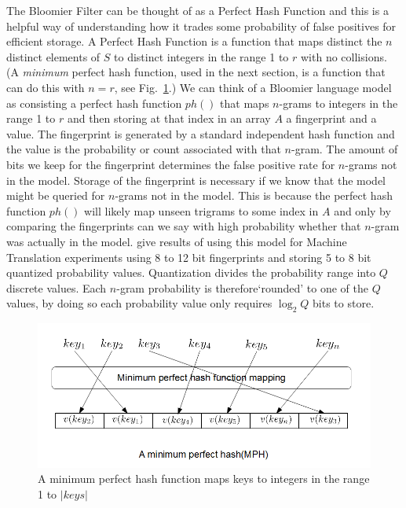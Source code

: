 \documentclass[10pt, a4paper]{article}
\begin{document}
The Bloomier Filter can be thought of as a Perfect Hash Function \cite{Botelho1997} and this is a helpful way of understanding how it trades some probability of false positives for efficient storage.  A Perfect Hash Function is a function that maps distinct the $n$ distinct elements of $S$ to distinct integers in the range 1 to $r$ with no collisions.  (A \emph{minimum} perfect hash function, used in the next section, is a function that can do this with $n=r$, see Fig.~\ref{fig:method}.)  We can think of a Bloomier language model as consisting a perfect hash function $ph()$ that maps $n$-grams to integers in the range 1 to $r$ and then storing at that index in an array $A$ a fingerprint and a value.  The fingerprint is generated by a standard independent hash function and the value is the probability or count associated with that $n$-gram.  The amount of bits we keep for the fingerprint determines the false positive rate for $n$-grams not in the model.  Storage of the fingerprint is necessary if we know that the model might be queried for $n$-grams not in the model.  This is because the perfect hash function $ph()$ will likely map unseen trigrams to some index in $A$ and only by comparing the fingerprints can we say with high probability whether that $n$-gram was actually in the model.  \cite{talbot1} give results of using this model for Machine Translation experiments using 8 to 12 bit fingerprints and storing 5 to 8 bit quantized probability values.  Quantization divides the 
probability range into $Q$ discrete values. Each $n$-gram probability is 
therefore`rounded' to one of the $Q$ values, by doing so each probability value 
only requires $\log_2{Q}$ bits to store.


\begin{figure}[htp]
\protect\includegraphics[scale=0.3]{pics/mph}
\caption{A minimum perfect hash function maps keys to integers in the range 1 to $|keys|$}
\label{fig:method}
\end{figure}
\end{document}
